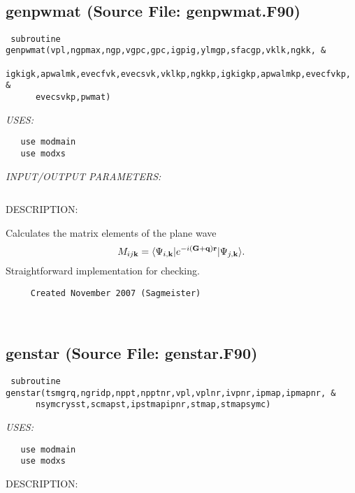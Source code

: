 \documentclass[11pt]{article}
\begin{document}
 
 
\mbox{}\hrulefill\ 
 
\subsection{genpwmat (Source File: genpwmat.F90)}


\begin{verbatim} subroutine genpwmat(vpl,ngpmax,ngp,vgpc,gpc,igpig,ylmgp,sfacgp,vklk,ngkk, &
      igkigk,apwalmk,evecfvk,evecsvk,vklkp,ngkkp,igkigkp,apwalmkp,evecfvkp, &
      evecsvkp,pwmat)\end{verbatim}{\em USES:}
\begin{verbatim}   use modmain
   use modxs\end{verbatim}{\em INPUT/OUTPUT PARAMETERS:}
\begin{verbatim} \end{verbatim}
{\sf DESCRIPTION:\\ }

    Calculates the matrix elements of the plane wave
     $$ M_{ij{\bf k}}=\langle\Psi_{i,{\bf k}}|e^{-i({\bf G}+{\bf q}){\bf r}}|
        \Psi_{j,{\bf k}}\rangle. $$
    Straightforward implementation for checking.
  
\begin{verbatim}     Created November 2007 (Sagmeister)\end{verbatim}






 
 
\mbox{}\hrulefill\ 
 
\subsection{genstar (Source File: genstar.F90)}


\begin{verbatim} subroutine genstar(tsmgrq,ngridp,nppt,npptnr,vpl,vplnr,ivpnr,ipmap,ipmapnr, &
      nsymcrysst,scmapst,ipstmapipnr,stmap,stmapsymc)\end{verbatim}{\em USES:}
\begin{verbatim}   use modmain
   use modxs\end{verbatim}
{\sf DESCRIPTION:\\ }
\end{document}
